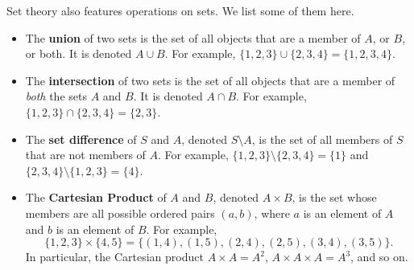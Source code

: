 Set theory also features operations on sets. We list some of them here.
\begin{itemize}
    \item The \textbf{union} of two sets is the set of all objects that are a member of $A$, or $B$, or both. It is denoted $A \cup B$. For example, $\{1, 2, 3\} \cup \{2, 3, 4\} = \{1, 2, 3, 4\}$.
    \item The \textbf{intersection} of two sets is the set of all objects that are a member of \textit{both} the sets $A$ and $B$. It is denoted $A \cap B$. For example, $\{1, 2, 3\} \cap \{2, 3, 4\} = \{2, 3\}$.
    \item The \textbf{set difference} of $S$ and $A$, denoted $S \setminus A$, is the set of all members of $S$ that are not members of $A$. For example, $\{1, 2, 3\} \setminus \{2, 3, 4\} = \{1\}$ and $\{2, 3, 4\} \setminus \{1, 2, 3\} = \{4\}$.
    \item The \textbf{Cartesian Product} of $A$ and $B$, denoted $A \times B$, is the set whose members are all possible ordered pairs $(a, b)$, where $a$ is an element of $A$ and $b$ is an element of $B$. For example,
    \[
        \{1, 2, 3\} \times \{4, 5\} = \{(1, 4), (1, 5), (2, 4), (2, 5), (3, 4), (3, 5)\}.
    \]
    In particular, the Cartesian product $A \times A = A^2$, $A\times A \times A = A^3$, and so on.
\end{itemize}


